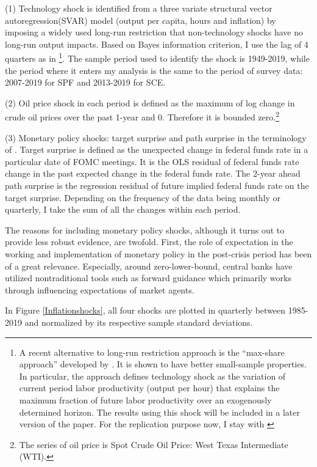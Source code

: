 \documentclass[12pt]{article}
\begin{document}
	
	(1) Technology shock is identified from a three variate structural vector autoregression(SVAR) model  (output per capita, hours and inflation) by imposing a widely used long-run restriction that non-technology shocks have no long-run output impacts. Based on Bayes information criterion, I use the lag of 4 quarters as in \citet{coibion2012can} \footnote{A recent alternative to long-run restriction approach is the ``max-share approach'' developed by \citet{francis2014flexible}. It is shown to have better small-sample properties. In particular,  the approach defines technology shock as the variation of current period labor productivity (output per hour) that explains the maximum fraction of future labor productivity over an exogenously determined horizon. The results using this shock will be included in a later version of the paper. For the replication purpose now, I stay with \citet{gali1999technology}}. The sample period used to identify the shock is 1949-2019, while the period where it enters my analysis is the same to the period of survey data: 2007-2019 for SPF and 2013-2019 for SCE. 
	
	(2) Oil price shock in each period is defined as the maximum of log change in crude oil prices over the past 1-year and 0. Therefore it is bounded zero.\footnote{The series of oil price is Spot Crude Oil Price: West Texas Intermediate (WTI).}
	
	(3) Monetary policy shocks: target surprise and path surprise in the terminology of \citet{laseen2011anticipated}. Target surprise is defined as the unexpected change in federal funds rate in a particular date of FOMC meetings. It is the OLS residual of federal funds rate change in the past expected change in the federal funds rate. The 2-year ahead path surprise is the regression residual of future implied federal funds rate on the target surprise. Depending on the frequency of the data being monthly or quarterly, I take the sum of all the changes within each period.   
	
	The reasons for including monetary policy shocks, although it turns out to provide less robust evidence, are twofold. First, the role of expectation in the working and implementation of monetary policy in the post-crisis period has been of a great relevance. Especially, around zero-lower-bound, central banks have utilized nontraditional tools such as forward guidance which primarily works through influencing expectations of market agents. 
	
	In Figure \ref{Inflationshocks}, all four shocks are plotted in quarterly between 1985-2019 and normalized by its respective sample standard deviations. 
	
\end{document}
